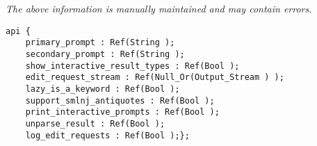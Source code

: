 \label{api:Mythryl\_Parser}

{\tiny \it The above information is manually maintained and may contain errors.}
\begin{verbatim}
api {
    primary_prompt : Ref(String );
    secondary_prompt : Ref(String );
    show_interactive_result_types : Ref(Bool );
    edit_request_stream : Ref(Null_Or(Output_Stream ) );
    lazy_is_a_keyword : Ref(Bool );
    support_smlnj_antiquotes : Ref(Bool );
    print_interactive_prompts : Ref(Bool );
    unparse_result : Ref(Bool );
    log_edit_requests : Ref(Bool );};
\end{verbatim}
